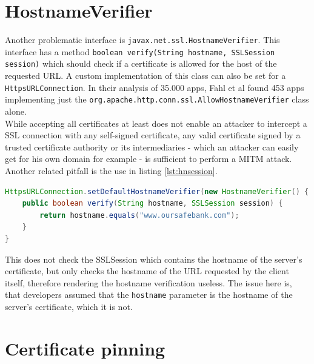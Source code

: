 \documentclass[draft,final]{vutinfth} %
\begin{document}
\section*{HostnameVerifier}

Another problematic interface is \texttt{javax.net.ssl.HostnameVerifier}. This interface has a method \texttt{boolean verify(String hostname, SSLSession session)} which should check if a certificate is allowed for the host of the requested URL. A custom implementation of this class can also be set for a \texttt{HttpsURLConnection}. In their analysis of 35.000 apps, Fahl et al \cite{Fahl2012} found 453 apps implementing just the \texttt{org.apache.http.conn.ssl.AllowHostnameVerifier} class alone. \\
While accepting all certificates at least does not enable an attacker to intercept a SSL connection with any self-signed certificate, any valid certificate signed by a trusted certificate authority or its intermediaries - which an attacker can easily get for his own domain for example - is sufficient to perform a MITM attack.\\
Another related pitfall is the use in listing \ref{lst:hnsession}.
\begin{lstlisting}[language=Java,caption={Hostnameverifier ignoring session \cite{PinningSymposium}},label={lst:hnsession},frame=tb,columns=fullflexible]
HttpsURLConnection.setDefaultHostnameVerifier(new HostnameVerifier() {
    public boolean verify(String hostname, SSLSession session) {
        return hostname.equals("www.oursafebank.com");
    }
}
\end{lstlisting}
This does not check the SSLSession which contains the hostname of the server's certificate, but only checks the hostname of the URL requested by the client itself, therefore rendering the hostname verification useless. The issue here is, that developers assumed that the \texttt{hostname} parameter is the hostname of the server's certificate, which it is not.

\section*{Certificate pinning}
\end{document}
